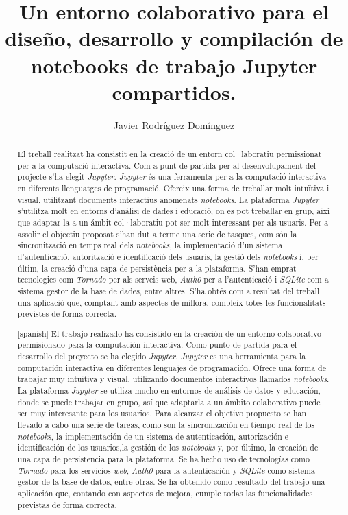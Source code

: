 \documentclass[11pt,spanish,listoffigures]{tfgetsinf}
\title{Un entorno colaborativo para el diseño, desarrollo y compilación de notebooks de trabajo Jupyter compartidos. }
\author{Javier Rodríguez Domínguez}
\begin{document}

\begin{abstract}
El treball realitzat ha consistit en la creació de un entorn col·laboratiu permissionat per a la computació interactiva. Com a punt de partida per al desenvolupament del projecte s'ha elegit \textit{Jupyter}. \textit{Jupyter} és una ferramenta per a la computació interactiva en diferents llenguatges  de programació. Ofereix una forma de treballar molt intuïtiva i visual, utilitzant documents interactius anomenats \textit{notebooks}. La plataforma \textit{Jupyter} s'utilitza molt en entorns d'anàlisi de dades i educació, on es pot treballar en grup, així que adaptar-la a un ámbit col·laboratiu pot ser molt interessant per als usuaris. Per a assolir el objectiu proposat s'han dut a terme una serie de tasques, com són la sincronització en temps real dels \textit{notebooks}, la implementació d'un sistema d'autenticació, autorització e identificació dels usuaris, la gestió dels \textit{notebooks} i, per últim, la creació d'una capa de persistència per a la plataforma. S'han emprat tecnologies com \textit{Tornado} per als serveis web, \textit{Auth0} per a l'autenticació i \textit{SQLite} com a sistema gestor de la base de dades, entre altres. S'ha obtés com a resultat del treball una aplicació que, comptant amb aspectes de millora, compleix totes les funcionalitats previstes de forma correcta.
\end{abstract}
\begin{abstract}[spanish]
El trabajo realizado ha consistido en la creación de un entorno colaborativo permisionado para la computación interactiva. Como punto de partida para el desarrollo del proyecto se ha elegido \textit{Jupyter}. \textit{Jupyter} es una herramienta para la computación interactiva en diferentes lenguajes de programación. Ofrece una forma de trabajar muy intuitiva y visual, utilizando documentos interactivos llamados \textit{notebooks}. La plataforma \textit{Jupyter} se utiliza mucho en entornos de análisis de datos y educación, donde se puede trabajar en grupo, así que adaptarla a un ámbito colaborativo puede ser muy interesante para los usuarios. Para alcanzar el objetivo propuesto se han llevado a cabo una serie de tareas, como son la sincronización en tiempo real de los \textit{notebooks}, la implementación de un sistema de autenticación, autorización e identificación de los usuarios,la gestión de los \textit{notebooks} y, por último, la creación de una capa de persistencia para la plataforma. Se ha hecho uso de tecnologías como \textit{Tornado} para los servicios \textit{web}, \textit{Auth0} para la autenticación y \textit{SQLite} como sistema gestor de la base de datos, entre otras. Se ha obtenido como resultado del trabajo una aplicación que, contando con aspectos de mejora, cumple todas las funcionalidades previstas de forma correcta.
\end{abstract}
\end{document}
